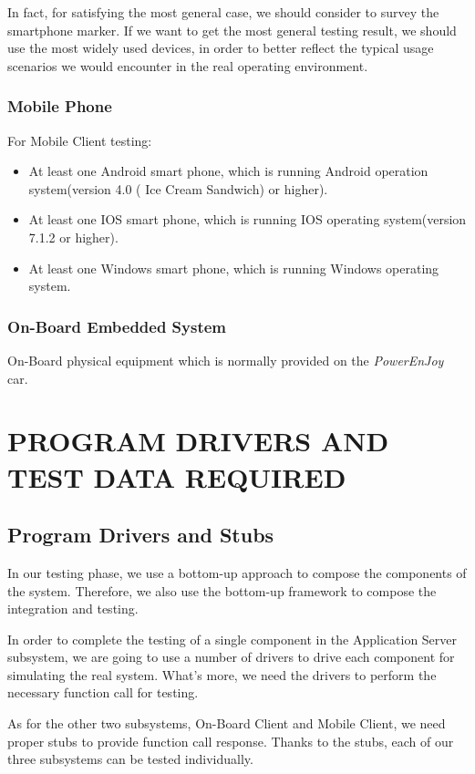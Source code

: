 \documentclass[a4paper,11pt]{article}
\begin{document}
In fact, for satisfying the most general case, we should consider to survey the smartphone marker. If we want to get the most general testing result, we should use the most widely used devices, in order to better reflect the typical usage scenarios we would encounter in the real operating environment.
		\subsubsection{Mobile Phone}
		For Mobile Client testing: 
			\begin{itemize}
			\item At least one Android smart phone, which is running Android operation system(version 4.0 ( Ice Cream Sandwich) or higher).
			\item At least one IOS smart phone, which is running IOS operating system(version 7.1.2 or higher).
			\item At least one Windows smart phone, which is running Windows operating system.
			\end{itemize}					
		
		\subsubsection{On-Board Embedded System}
		On-Board physical equipment which is normally provided on the \textsl{PowerEnJoy} car.
		


\newpage
\section{PROGRAM DRIVERS AND TEST DATA REQUIRED}
	\subsection{Program Drivers and Stubs}
	In our testing phase, we use a bottom-up approach to compose the components of the system. Therefore, we also use the bottom-up framework to compose the integration and testing.

In order to complete the testing of a single component in the Application Server subsystem, we are going to use a number of drivers to drive each component for simulating the real system. What's more, we need the drivers to perform the necessary function call for testing.

As for the other two subsystems, On-Board Client and Mobile Client, we need proper stubs to provide function call response. Thanks to the stubs, each of our three subsystems can be tested individually. 
\end{document}
